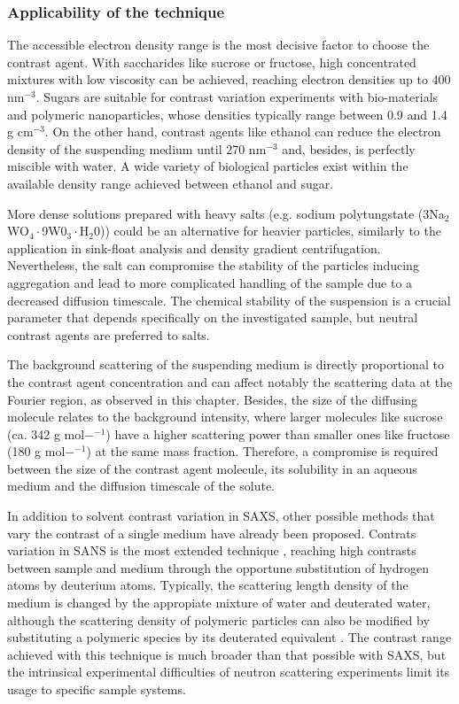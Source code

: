 \subsubsection{Applicability of the technique}

The accessible electron density range is the most decisive factor to choose the contrast agent. With saccharides like sucrose or fructose, high concentrated mixtures with low viscosity can be achieved, reaching electron densities up to 400 nm$^{-3}$. Sugars are suitable for contrast variation experiments with bio-materials and polymeric nanoparticles, whose densities typically range between 0.9 and 1.4 g cm$^{-3}$. On the other hand, contrast agents like ethanol can reduce the electron density of the suspending medium until 270 nm$^{-3}$ and, besides, is perfectly miscible with water. A wide variety of biological particles exist within the available density range achieved between ethanol and sugar.

More dense solutions prepared with heavy salts (e.g. sodium polytungstate (3Na$_2$WO$_4\cdot$9W0$_3\cdot$H$_2$0)) could be an alternative for heavier particles, similarly to the application in sink-float analysis and density gradient centrifugation. Nevertheless, the salt can compromise the stability of the particles inducing aggregation and lead to more complicated handling of the sample due to a decreased diffusion timescale. The chemical stability of the suspension is a crucial parameter that depends specifically on the investigated sample, but neutral contrast agents are preferred to salts.

The background scattering of the suspending medium is directly proportional to the contrast agent concentration and can affect notably the scattering data at the Fourier region, as observed in this chapter. Besides, the size of the diffusing molecule relates to the background intensity, where larger molecules like sucrose (ca. 342 g mol$-^{-1}$) have a higher scattering power than smaller ones like fructose (180 g mol$-^{-1}$) at the same mass fraction. Therefore, a compromise  is required between the size of the contrast agent molecule, its solubility in an aqueous medium and the diffusion timescale of the solute.

In addition to solvent contrast variation in SAXS, other possible methods that vary the contrast of a single medium have already been proposed. Contrats variation in SANS is the most extended technique \citep{ballauff_analysis_2011, ballauff_saxs_2001-1}, reaching high contrasts between sample and medium through the opportune substitution of hydrogen atoms by deuterium atoms. Typically, the scattering length density of the medium is changed by the appropiate mixture of water and deuterated water, although the scattering density of polymeric particles can also be modified by substituting a polymeric species by its deuterated equivalent \citep{rosenfeldt_distribution_2002}. The contrast range achieved with this technique is much broader than that possible with SAXS, but the intrinsical experimental difficulties of neutron scattering experiments limit its usage to specific sample systems.


